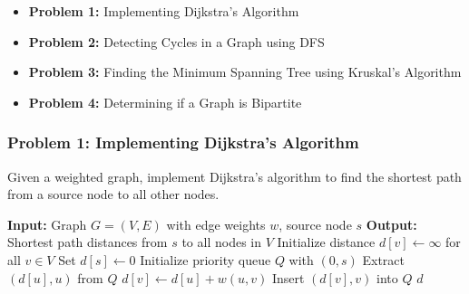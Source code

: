 \documentclass[12pt]{book} %
\begin{document}
\begin{itemize}
    \item \textbf{Problem 1:} Implementing Dijkstra's Algorithm
    \item \textbf{Problem 2:} Detecting Cycles in a Graph using DFS
    \item \textbf{Problem 3:} Finding the Minimum Spanning Tree using Kruskal's Algorithm
    \item \textbf{Problem 4:} Determining if a Graph is Bipartite
\end{itemize}

\subsubsection*{Problem 1: Implementing Dijkstra's Algorithm}
Given a weighted graph, implement Dijkstra's algorithm to find the shortest path from a source node to all other nodes.

\begin{algorithm}
\caption{Dijkstra's Algorithm}
\begin{algorithmic}[1]
\State \textbf{Input:} Graph $G=(V, E)$ with edge weights $w$, source node $s$
\State \textbf{Output:} Shortest path distances from $s$ to all nodes in $V$
\State Initialize distance $d[v] \gets \infty$ for all $v \in V$
\State Set $d[s] \gets 0$
\State Initialize priority queue $Q$ with $(0, s)$
    \State Extract $(d[u], u)$ from $Q$
            \State $d[v] \gets d[u] + w(u, v)$
            \State Insert $(d[v], v)$ into $Q$
        \EndIf
    \EndFor
\EndWhile
\State \Return $d$
\end{algorithmic}
\end{algorithm}
\end{document}
